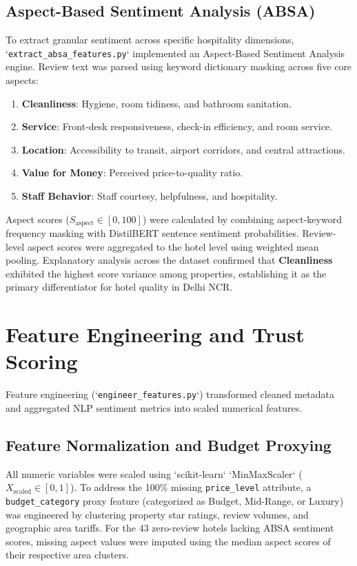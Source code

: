 \subsection{Aspect-Based Sentiment Analysis (ABSA)}
To extract granular sentiment across specific hospitality dimensions, `\texttt{extract\_absa\_features.py}` implemented an Aspect-Based Sentiment Analysis engine. Review text was parsed using keyword dictionary masking across five core aspects:
\begin{enumerate}
    \item \textbf{Cleanliness}: Hygiene, room tidiness, and bathroom sanitation.
    \item \textbf{Service}: Front-desk responsiveness, check-in efficiency, and room service.
    \item \textbf{Location}: Accessibility to transit, airport corridors, and central attractions.
    \item \textbf{Value for Money}: Perceived price-to-quality ratio.
    \item \textbf{Staff Behavior}: Staff courtesy, helpfulness, and hospitality.
\end{enumerate}

Aspect scores ($S_{\text{aspect}} \in [0, 100]$) were calculated by combining aspect-keyword frequency masking with DistilBERT sentence sentiment probabilities. Review-level aspect scores were aggregated to the hotel level using weighted mean pooling. Explanatory analysis across the dataset confirmed that \textbf{Cleanliness} exhibited the highest score variance among properties, establishing it as the primary differentiator for hotel quality in Delhi NCR.

\section{Feature Engineering and Trust Scoring}
Feature engineering (`\texttt{engineer\_features.py}`) transformed cleaned metadata and aggregated NLP sentiment metrics into scaled numerical features.

\subsection{Feature Normalization and Budget Proxying}
All numeric variables were scaled using `scikit-learn` `MinMaxScaler` ($X_{\text{scaled}} \in [0, 1]$). To address the 100\% missing \texttt{price\_level} attribute, a \texttt{budget\_category} proxy feature (categorized as Budget, Mid-Range, or Luxury) was engineered by clustering property star ratings, review volumes, and geographic area tariffs. For the 43 zero-review hotels lacking ABSA sentiment scores, missing aspect values were imputed using the median aspect scores of their respective area clusters.

